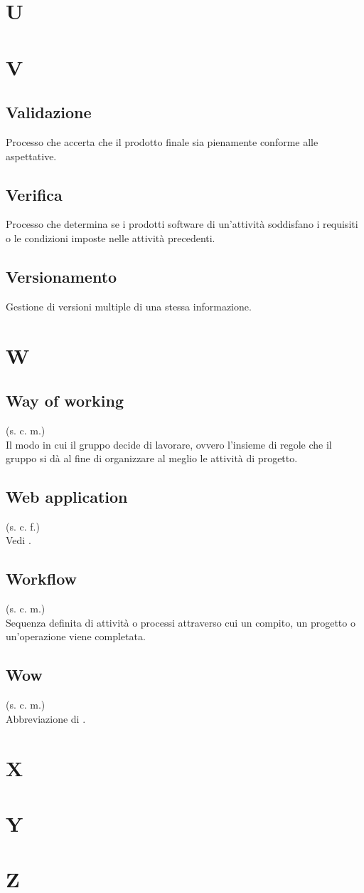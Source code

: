 \section{U}
\pagebreak
\section{V}
    \subsection{Validazione}
    Processo che accerta che il prodotto finale sia pienamente conforme alle aspettative.
    \subsection{Verifica}
    Processo che determina se i prodotti software di un'attività soddisfano
    i requisiti o le condizioni imposte nelle attività precedenti.
    \subsection{Versionamento}
    Gestione di versioni multiple di una stessa informazione.
\pagebreak
\section{W}
    \subsection{Way of working}
    \label{Way of working}
    (s. c. m.)\\
    Il modo in cui il gruppo decide di lavorare, ovvero l'insieme di regole 
    che il gruppo si dà al fine di organizzare al meglio le attività di progetto.
    \subsection{Web application}
    (s. c. f.)\\
    Vedi .
    \subsection{Workflow}
    (s. c. m.)\\
    Sequenza definita di attività o processi attraverso cui un compito, un progetto 
    o un'operazione viene completata.
    \subsection{Wow}
    (s. c. m.)\\
    Abbreviazione di .
\pagebreak
\section{X}
\pagebreak
\section{Y}
\pagebreak
\section{Z}
